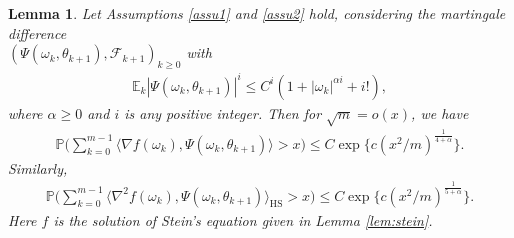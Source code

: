 \documentclass[12pt]{amsart}
\newtheorem{lemma}[theorem]{Lemma}
\theoremstyle{definition}
\theoremstyle{remark}
\numberwithin{equation}{section}
\newcommand{\E}{\mathbb{E}}            %
\newcommand{\Ll}{\langle}
\newcommand{\Rr}{\rangle}
\newcommand{\PP}{\mathbb{P}}
\begin{document}
\begin{lemma}\label{lem:RC}
	Let Assumptions \ref{assu1} and \ref{assu2} hold, considering the martingale difference\\ $(\Psi(\omega_k,\theta_{k+1}), \mathcal F_{k+1})_{k\ge0}$ with
	\begin{eqnarray}\label{e:RC}
		\E_k|\Psi(\omega_k,\theta_{k+1})|^i\le 		C^i(1+|\omega_k|^{\alpha i}+i!),
	\end{eqnarray}
	where $\alpha\ge0$ and $i$ is any positive integer. Then for $\sqrt m=o(x)$, we have
	\begin{eqnarray}\label{e:RC1}
		\PP\Big(\sum_{k=0}^{m-1} \Ll \nabla f(\omega_k), \Psi(\omega_k,\theta_{k+1}) \Rr >x\Big)\le C\exp\{c(x^2/m)^{\frac1{4+\alpha}}\}.
	\end{eqnarray}
	Similarly,
	\begin{eqnarray}\label{e:RC2}
		\PP\Big(\sum_{k=0}^{m-1} \Ll \nabla^2 f(\omega_k), \Psi(\omega_k,\theta_{k+1}) \Rr_{\mathrm{HS}} >x\Big)\le C\exp\{c(x^2/m)^{\frac1{5+\alpha}}\}.
	\end{eqnarray}
	Here $f$ is the solution of Stein's equation given in Lemma \ref{lem:stein}.
	
\end{lemma}	
\end{document}

